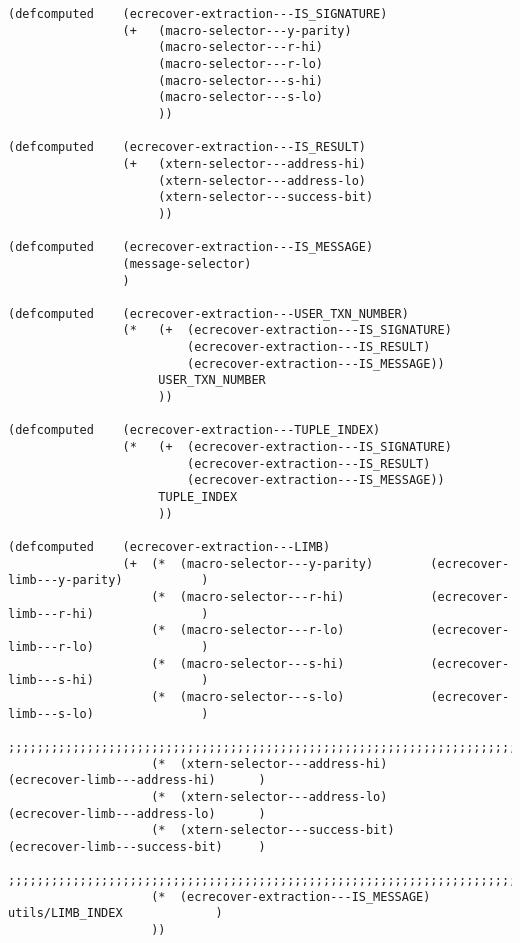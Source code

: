 \documentclass[varwidth=\maxdimen,margin=0.5cm,multi={verbatim}]{standalone}
\begin{document}
\begin{verbatim}
(defcomputed    (ecrecover-extraction---IS_SIGNATURE)
                (+   (macro-selector---y-parity)
                     (macro-selector---r-hi)
                     (macro-selector---r-lo)
                     (macro-selector---s-hi)
                     (macro-selector---s-lo)
                     ))

(defcomputed    (ecrecover-extraction---IS_RESULT)
                (+   (xtern-selector---address-hi)
                     (xtern-selector---address-lo)
                     (xtern-selector---success-bit)
                     ))

(defcomputed    (ecrecover-extraction---IS_MESSAGE)
                (message-selector)
                )

(defcomputed    (ecrecover-extraction---USER_TXN_NUMBER)
                (*   (+  (ecrecover-extraction---IS_SIGNATURE)
                         (ecrecover-extraction---IS_RESULT)
                         (ecrecover-extraction---IS_MESSAGE))
                     USER_TXN_NUMBER
                     ))

(defcomputed    (ecrecover-extraction---TUPLE_INDEX)
                (*   (+  (ecrecover-extraction---IS_SIGNATURE)
                         (ecrecover-extraction---IS_RESULT)
                         (ecrecover-extraction---IS_MESSAGE))
                     TUPLE_INDEX
                     ))

(defcomputed    (ecrecover-extraction---LIMB)
                (+  (*  (macro-selector---y-parity)        (ecrecover-limb---y-parity)           )
                    (*  (macro-selector---r-hi)            (ecrecover-limb---r-hi)               )
                    (*  (macro-selector---r-lo)            (ecrecover-limb---r-lo)               )
                    (*  (macro-selector---s-hi)            (ecrecover-limb---s-hi)               )
                    (*  (macro-selector---s-lo)            (ecrecover-limb---s-lo)               )
                    ;;;;;;;;;;;;;;;;;;;;;;;;;;;;;;;;;;;;;;;;;;;;;;;;;;;;;;;;;;;;;;;;;;;;;;;;;;;;;;
                    (*  (xtern-selector---address-hi)         (ecrecover-limb---address-hi)      )
                    (*  (xtern-selector---address-lo)         (ecrecover-limb---address-lo)      )
                    (*  (xtern-selector---success-bit)        (ecrecover-limb---success-bit)     )
                    ;;;;;;;;;;;;;;;;;;;;;;;;;;;;;;;;;;;;;;;;;;;;;;;;;;;;;;;;;;;;;;;;;;;;;;;;;;;;;;
                    (*  (ecrecover-extraction---IS_MESSAGE)         utils/LIMB_INDEX             )
                    ))


\end{verbatim}
\end{document}
